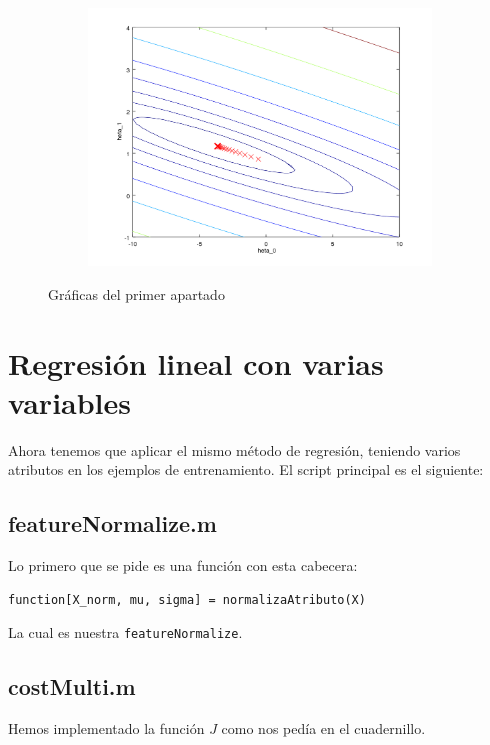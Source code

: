 \documentclass{article}
\begin{document}
\begin{figure}
\begin{subfigure}{\textwidth}
\includegraphics[width=\linewidth]{contourTheta}
\caption{}
\label{fig:contorno}
\end{subfigure}

\caption{Gráficas del primer apartado}
\end{figure}

\section{Regresión lineal con varias variables}
Ahora tenemos que aplicar el mismo método de regresión, teniendo varios atributos en los ejemplos de entrenamiento. El script principal es el siguiente:


\subsection{featureNormalize.m}
Lo primero que se pide es una función con esta cabecera:
\begin{lstlisting}[style=snippet]
function[X_norm, mu, sigma] = normalizaAtributo(X)
\end{lstlisting}
La cual es nuestra {\tt featureNormalize}.


\subsection{costMulti.m}
Hemos implementado la función $J$ como nos pedía en el cuadernillo.

\end{document}
